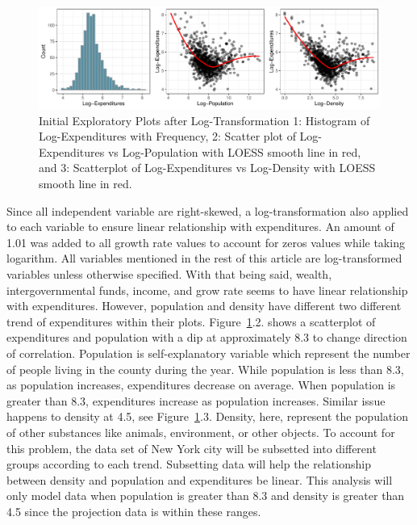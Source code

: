 \documentclass[11pt]{article}\usepackage[]{graphicx}\usepackage[]{color}
\makeatletter
\def\maxwidth{ %
  \ifdim\Gin@nat@width>\linewidth
    \linewidth
  \else
    \Gin@nat@width
  \fi
}
\makeatother
\begin{document}
\begin{figure}[h!] 
\begin{center}

\includegraphics[width=\maxwidth]{figure/unnamed-chunk-1-1} 

\caption{Initial Exploratory Plots after Log-Transformation 1: Histogram of Log-Expenditures with Frequency, 2: Scatter plot of Log-Expenditures vs Log-Population with LOESS smooth line in red, and 3: Scatterplot of Log-Expenditures vs Log-Density with LOESS smooth line in red.}
\label{inital-explore}
\end{center} 
\end{figure}

\noindent Since all independent variable are right-skewed, a log-transformation also applied to each variable to ensure linear relationship with expenditures. An amount of 1.01 was added to all growth rate values to account for zeros values while taking logarithm. All variables mentioned in the rest of this article are log-transformed variables unless otherwise specified. With that being said, wealth, intergovernmental funds, income, and grow rate seems to have linear relationship with expenditures. However, population and density have different two different trend of expenditures within their plots. Figure~\ref{inital-explore}.2. shows a scatterplot of expenditures and population with a dip at approximately 8.3 to change direction of correlation. Population is self-explanatory variable which represent the number of people living in the county during the year. While population is less than 8.3, as population increases, expenditures decrease on average. When population is greater than 8.3, expenditures increase as population increases. Similar issue happens to density at 4.5, see Figure~\ref{inital-explore}.3. Density, here, represent the population of other substances like animals, environment, or other objects. To account for this problem, the data set of New York city will be subsetted into different groups according to each trend. Subsetting data will help the relationship between density and population and expenditures be linear. This analysis will only model data when population is greater than 8.3 and density is greater than 4.5 since the projection data is within these ranges.    
\end{document}
